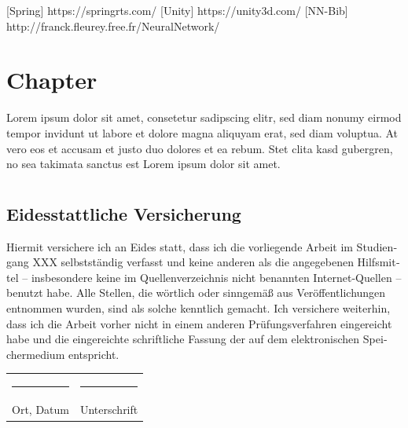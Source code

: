 \documentclass[
	12pt,
	a4paper,
	BCOR10mm,
	DIV14,
	headsepline,
	usegeometry,
]{scrreprt}
\begin{document}



\appendix
\appendixpage

[Spring] https://springrts.com/
[Unity] https://unity3d.com/
[NN-Bib] http://franck.fleurey.free.fr/NeuralNetwork/

\chapter{Chapter}

Lorem ipsum dolor sit amet, consetetur sadipscing elitr, sed diam nonumy eirmod tempor invidunt ut labore et dolore magna aliquyam erat, sed diam voluptua.
At vero eos et accusam et justo duo dolores et ea rebum.
Stet clita kasd gubergren, no sea takimata sanctus est Lorem ipsum dolor sit amet.

\listoffigures

\lstlistoflistings

\listoftables

\chapter*{}

\thispagestyle{empty}

\section*{Eidesstattliche Versicherung}

\begin{otherlanguage}{ngerman}
Hiermit versichere ich an Eides statt, dass ich die vorliegende Arbeit im Studiengang XXX selbstständig verfasst und keine anderen als die angegebenen Hilfsmittel -- insbesondere keine im Quellenverzeichnis nicht benannten Internet-Quellen -- benutzt habe.
Alle Stellen, die wörtlich oder sinngemäß aus Veröffentlichungen entnommen wurden, sind als solche kenntlich gemacht.
Ich versichere weiterhin, dass ich die Arbeit vorher nicht in einem anderen Prüfungsverfahren eingereicht habe und die eingereichte schriftliche Fassung der auf dem elektronischen Speichermedium entspricht.
\end{otherlanguage}

\vspace{1cm}

\begin{center}
\begin{tabular}{ll}
	\rule{0.35\textwidth}{0.4pt} & \rule{0.55\textwidth}{0.4pt} \\
	Ort, Datum & Unterschrift
\end{tabular}
\end{center}
\end{document}
